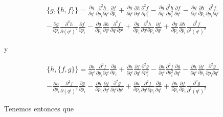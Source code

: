 \documentclass[a4paper,10pt]{article}
\numberwithin{equation}{section}
\begin{document}
\begin{align}
  \{g,\{h,f\}\} = \frac{\partial g}{\partial q^i}
  \frac{\partial^2 h}{\partial p_i\partial q^i}\frac{\partial f}{\partial p_i} 
  + \frac{\partial g}{\partial q^i}
  \frac{\partial h}{\partial q^i}\frac{\partial^2 f}{\partial p_i^2} 
  -\frac{\partial g}{\partial q^i}
  \frac{\partial^2 h}{\partial p_i^2}\frac{\partial f}{\partial q^i} 
  -\frac{\partial g}{\partial q^i} 
  \frac{\partial h}{\partial p_i}\frac{\partial^2 f}{\partial p_i \partial q^i} \\
   - \frac{\partial g}{\partial p_i}\frac{\partial^2 h}{\partial (q^i)^2}
  \frac{\partial f}{\partial p_i} - \frac{\partial g}{\partial p_i}\frac{\partial h}{\partial q^i}
  \frac{\partial^2 f}{\partial q^i\partial p^i} + \frac{\partial g}{\partial p_i}\frac{\partial^2 h}{\partial q^i\partial p_i}
  \frac{\partial f}{\partial q^i} + \frac{\partial g}{\partial p_i}\frac{\partial h}{\partial p_i}
  \frac{\partial^2 f}{\partial^2(q^i)^2}
\end{align}

y

\begin{align}
  \{h,\{f,g\}\} = \frac{\partial h}{\partial q^i}
  \frac{\partial^2 f}{\partial p_i\partial q^i}\frac{\partial g}{\partial p_i} 
  + \frac{\partial h}{\partial q^i}
  \frac{\partial f}{\partial q^i}\frac{\partial^2 g}{\partial p_i^2} 
  -\frac{\partial h}{\partial q^i}
  \frac{\partial^2 f}{\partial p_i^2}\frac{\partial g}{\partial q^i} 
  -\frac{\partial h}{\partial q^i} 
  \frac{\partial f}{\partial p_i}\frac{\partial^2 g}{\partial p_i \partial q^i} \\
  - \frac{\partial h}{\partial p_i}\frac{\partial^2 f}{\partial (q^i)^2}
  \frac{\partial g}{\partial p_i} - \frac{\partial h}{\partial p_i}\frac{\partial f}{\partial q^i}
  \frac{\partial^2 g}{\partial q^i\partial p^i} + \frac{\partial h}{\partial p_i}\frac{\partial^2 f}{\partial q^i\partial p_i}
  \frac{\partial g}{\partial q^i} + \frac{\partial h}{\partial p_i}\frac{\partial f}{\partial p_i}
  \frac{\partial^2 g}{\partial^2(q^i)^2}
\end{align}


Tenemos entonces que 
\end{document}
